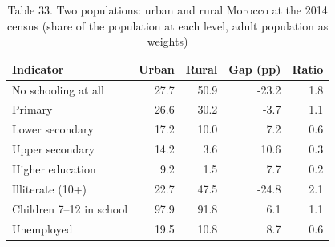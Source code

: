 \begin{table}
\caption{Table 33. Two populations: urban and rural Morocco at the 2014 census (share of the population at each level, adult population as weights)}
\label{tab:T33_two_populations}
\begin{tabular}{lrrrr}
\toprule
Indicator & Urban & Rural & Gap (pp) & Ratio \\
\midrule
No schooling at all & 27.7 & 50.9 & -23.2 & 1.8 \\
Primary & 26.6 & 30.2 & -3.7 & 1.1 \\
Lower secondary & 17.2 & 10.0 & 7.2 & 0.6 \\
Upper secondary & 14.2 & 3.6 & 10.6 & 0.3 \\
Higher education & 9.2 & 1.5 & 7.7 & 0.2 \\
Illiterate (10+) & 22.7 & 47.5 & -24.8 & 2.1 \\
Children 7–12 in school & 97.9 & 91.8 & 6.1 & 1.1 \\
Unemployed & 19.5 & 10.8 & 8.7 & 0.6 \\
\bottomrule
\end{tabular}
\end{table}
